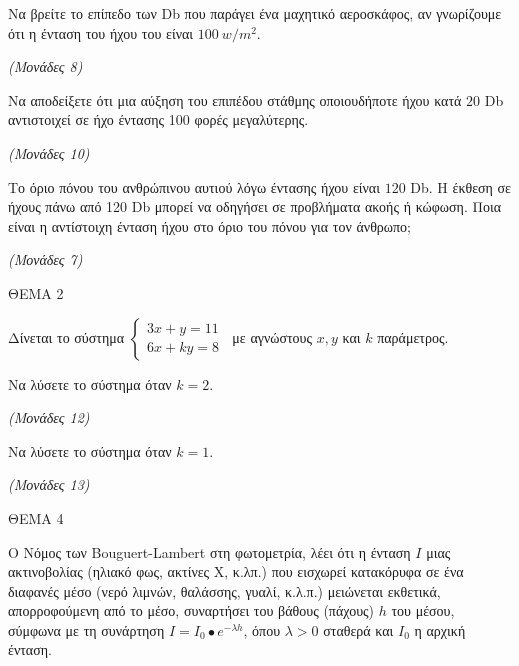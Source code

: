 \documentclass[11pt,a4paper,twoside]{book}
\newcommand{\monades}[1]{\hfill \textit{(Μονάδες #1)}}
\begin{document}
\begin{alist}
\item Να βρείτε το επίπεδο των Db που παράγει ένα μαχητικό αεροσκάφος, αν γνωρίζουμε ότι η ένταση του ήχου του είναι $100\ w/m^{2}$.

\monades{8}

\item Να αποδείξετε ότι μια αύξηση του επιπέδου στάθμης οποιουδήποτε ήχου κατά $20$ Db αντιστοιχεί σε ήχο έντασης 100 φορές μεγαλύτερης.

\monades{10}

\item Το όριο πόνου του ανθρώπινου αυτιού λόγω έντασης ήχου είναι $120$ Db. Η έκθεση σε ήχους πάνω από 120 Db μπορεί να οδηγήσει σε προβλήματα ακοής ή κώφωση. Ποια είναι η αντίστοιχη ένταση ήχου στο όριο του πόνου για τον άνθρωπο;

\monades{7}
\end{alist}

\vspace{4mm}

ΘΕΜΑ 2

Δίνεται το σύστημα \(\left\{ \begin{array}{r}
3x + y = 11 \\
6x + ky = 8
\end{array} \right.\ \) με αγνώστους $x,y$ και $k$ παράμετρος.

\begin{alist}
\item Να λύσετε το σύστημα όταν $k = 2$.

\monades{12}

\item Να λύσετε το σύστημα όταν $k = 1$.

\monades{13}
\end{alist}

\vspace{4mm}

ΘΕΜΑ 4

Ο Νόμος των Bouguert-Lambert στη φωτομετρία, λέει ότι η ένταση $Ι$ μιας ακτινοβολίας (ηλιακό φως, ακτίνες Χ, κ.λπ.) που εισχωρεί κατακόρυφα σε ένα διαφανές μέσο (νερό λιμνών, θαλάσσης, γυαλί, κ.λ.π.) μειώνεται εκθετικά, απορροφούμενη από το μέσο, συναρτήσει του βάθους (πάχους) $h$ του μέσου, σύμφωνα με τη συνάρτηση $I = I_{0} \bullet e^{- \lambda h}$, όπου $\lambda > 0$ σταθερά και $Ι_{0}$ η αρχική ένταση.
\end{document}
